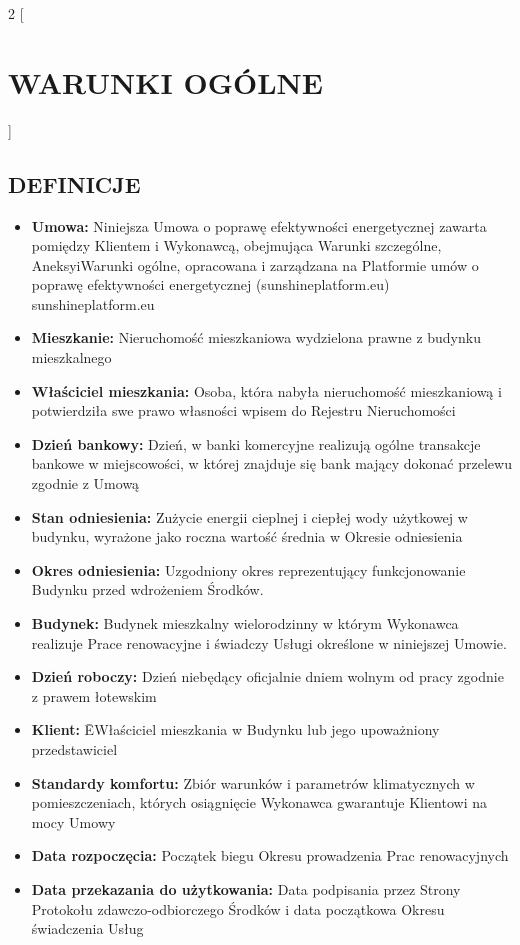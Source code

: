 \begin{multicols}{2}
[\section{WARUNKI OGÓLNE}]

\subsection{DEFINICJE}
\begin{itemize}[label={}]
	\item\textbf{Umowa:} Niniejsza Umowa o poprawę efektywności energetycznej zawarta pomiędzy Klientem i Wykonawcą, obejmująca Warunki szczególne, AneksyiWarunki ogólne, opracowana i zarządzana na Platformie umów o poprawę efektywności energetycznej (sunshineplatform.eu) sunshineplatform.eu
	\item\textbf{Mieszkanie:} Nieruchomość mieszkaniowa wydzielona prawne z budynku mieszkalnego
	\item\textbf{Właściciel mieszkania:} Osoba, która nabyła nieruchomość mieszkaniową i potwierdziła swe prawo własności wpisem do Rejestru Nieruchomości
	\item\textbf{Dzień bankowy:} Dzień, w banki komercyjne realizują ogólne transakcje bankowe w miejscowości, w której znajduje się bank mający dokonać przelewu zgodnie z Umową
	\item\textbf{Stan odniesienia:} Zużycie energii cieplnej i ciepłej wody użytkowej w budynku, wyrażone jako roczna wartość średnia w Okresie odniesienia
	\item\textbf{Okres odniesienia:} Uzgodniony okres reprezentujący funkcjonowanie Budynku przed wdrożeniem Środków.
	\item\textbf{Budynek:} Budynek mieszkalny wielorodzinny w którym Wykonawca realizuje Prace renowacyjne i świadczy Usługi określone w niniejszej Umowie.
	\item\textbf{Dzień roboczy:} Dzień niebędący oficjalnie dniem wolnym od pracy zgodnie z prawem łotewskim
	\item\textbf{Klient:} ĒWłaściciel mieszkania w Budynku lub jego upoważniony przedstawiciel
	\item\textbf{Standardy komfortu:} Zbiór warunków i parametrów klimatycznych w pomieszczeniach, których osiągnięcie Wykonawca gwarantuje Klientowi na mocy Umowy
	\item\textbf{Data rozpoczęcia:} Początek biegu Okresu prowadzenia Prac renowacyjnych
	\item\textbf{Data przekazania do użytkowania:} Data podpisania przez Strony Protokołu zdawczo-odbiorczego Środków i data początkowa Okresu świadczenia Usług

\end{itemize}
\end{multicols}

